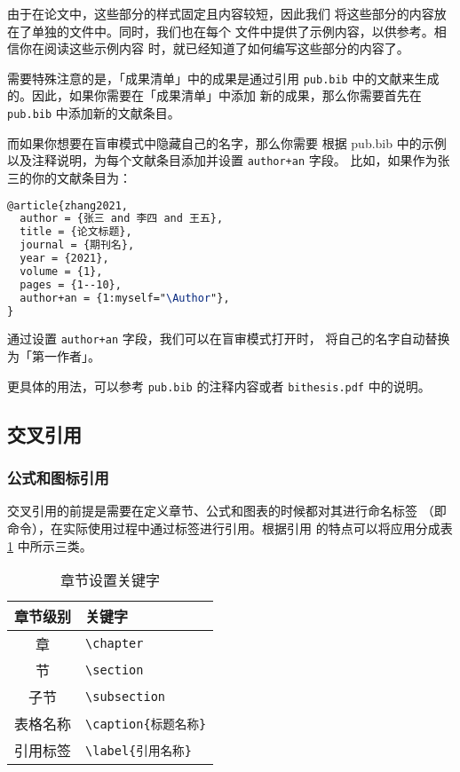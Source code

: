 由于在论文中，这些部分的样式固定且内容较短，因此我们
将这些部分的内容放在了单独的文件中。同时，我们也在每个
文件中提供了示例内容，以供参考。相信你在阅读这些示例内容
时，就已经知道了如何编写这些部分的内容了。

需要特殊注意的是，「成果清单」中的成果是通过引用 \texttt{pub.bib}
中的文献来生成的。因此，如果你需要在「成果清单」中添加
新的成果，那么你需要首先在 \texttt{pub.bib} 中添加新的文献条目。

而如果你想要在盲审模式中隐藏自己的名字，那么你需要
根据 pub.bib 中的示例以及注释说明，为每个文献条目添加并设置
 \texttt{author+an} 字段。
比如，如果作为张三的你的文献条目为：
\begin{lstlisting}[language=TeX]
@article{zhang2021,
  author = {张三 and 李四 and 王五},
  title = {论文标题},
  journal = {期刊名},
  year = {2021},
  volume = {1},
  pages = {1--10},
  author+an = {1:myself="\Author"},
}
\end{lstlisting}
通过设置 \texttt{author+an} 字段，我们可以在盲审模式打开时，
将自己的名字自动替换为「第一作者」。

更具体的用法，可以参考 \texttt{pub.bib} 的注释内容或者 \texttt{bithesis.pdf} 中的说明。

\subsection{交叉引用}

\subsubsection{公式和图标引用}

交叉引用的前提是需要在定义章节、公式和图表的时候都对其进行命名标签
（即\label{sec:labelName} 命令），在实际使用过程中通过标签进行引用。根据引用
的特点可以将应用分成表 \ref{tab:setSection} 中所示三类。

\begin{table}[htb]
 \centering
  \caption{章节设置关键字}     %
  \label{tab:setSection}    %
  \begin{tabular}{cl}
    \hline
    章节级别        & 关键字     \\
    \hline
     章        & \verb|\chapter| \\
     节        & \verb|\section | \\
    子节      & \verb|\subsection |\\
    表格名称       & \verb|\caption{标题名称}| \\
    引用标签       & \verb|\label{引用名称}| \\
    \hline
  \end{tabular}
\end{table}



